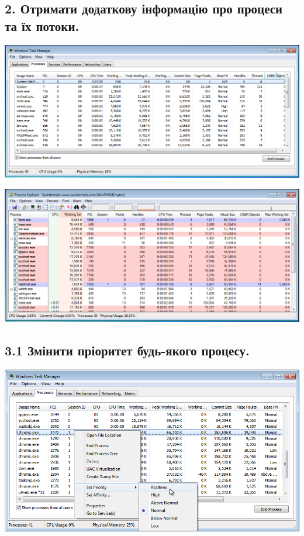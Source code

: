 \documentclass{article}
\begin{document}
\begin{normalsize}
	\subsection*{2. Отримати додаткову інформацію про процеси та їх потоки.}
	\begin{center}
		\includegraphics[scale=0.49]{usual1}
	\end{center}
	
	\begin{center}
		\includegraphics[scale=0.49]{usual2}
	\end{center}
	
	\subsection*{3.1 Змінити пріоритет будь-якого процесу.}
	\begin{center}
		\includegraphics[scale=0.6]{priority1}
	\end{center}
	

\end{normalsize}
\end{document}
